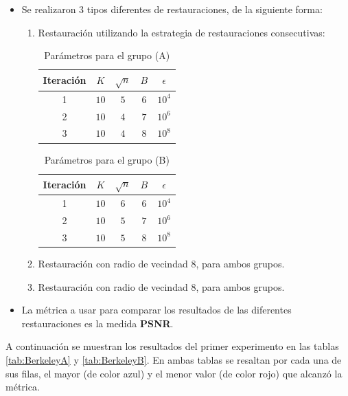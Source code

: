 \begin{itemize}
	\item Se realizaron 3 tipos diferentes de restauraciones, de la siguiente forma:
	\begin{enumerate}
		\item Restauraci\'on \SOP utilizando la estrategia de restauraciones consecutivas:
		\begin{table}[H]
			\centering
			\begin{tabular}{|c|cccc|}
				\hline
				Iteraci\'on & $K$ & $\sqrt{n}$ & $B$ & $\epsilon$ \\\hline
				1 & $10$ & $5$ & $6$ & $10^4$\\
				2 & $10$ & $4$ & $7$ & $10^6$\\
				3 & $10$ & $4$ & $8$ & $10^8$\\\hline
			\end{tabular}
			\caption{Par\'ametros para el grupo (A)}
		\end{table}
		\begin{table}[H]
			\centering
			\begin{tabular}{|c|cccc|}
				\hline
				Iteraci\'on & $K$ & $\sqrt{n}$ & $B$ & $\epsilon$ \\\hline
				1 & $10$ & $6$ & $6$ & $10^4$\\
				2 & $10$ & $5$ & $7$ & $10^6$\\
				3 & $10$ & $5$ & $8$ & $10^8$\\\hline
			\end{tabular}
			\caption{Par\'ametros para el grupo (B)}
		\end{table}
		\item Restauraci\'on \TELEA con radio de vecindad $8$, para ambos grupos.
		\item Restauraci\'on \NS con radio de vecindad $8$, para ambos grupos.
	\end{enumerate}
	\item La m\'etrica a usar para comparar los resultados de las diferentes restauraciones es la medida \textbf{PSNR}.
\end{itemize}



A continuaci\'on se muestran los resultados del primer experimento en las tablas \ref{tab:BerkeleyA} y \ref{tab:BerkeleyB}. En ambas tablas se resaltan por cada una de sus filas, el mayor (de color azul) y el menor valor (de color rojo) que alcanz\'o la m\'etrica.

